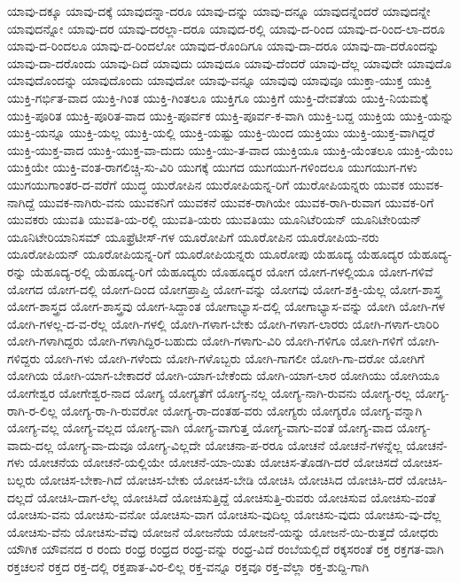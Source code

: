 {ಯಾವು-ದಕ್ಕೂ
ಯಾವು-ದಕ್ಕೆ
ಯಾವುದನ್ನಾ-ದರೂ
ಯಾವು-ದನ್ನು
ಯಾವು-ದನ್ನೂ
ಯಾವುದನ್ನೆಂದರೆ
ಯಾವುದನ್ನೇ
ಯಾವುದನ್ನೋ
ಯಾವು-ದರ
ಯಾವು-ದರಲ್ಲಾ-ದರೂ
ಯಾವುದ-ರಲ್ಲಿ
ಯಾವು-ದ-ರಿಂದ
ಯಾವು-ದ-ರಿಂದ-ಲಾ-ದರೂ
ಯಾವು-ದ-ರಿಂದಲೂ
ಯಾವು-ದ-ರಿಂದಲೋ
ಯಾವುದ-ರೊಂದಿಗೂ
ಯಾವು-ದಾ-ದರೂ
ಯಾವು-ದಾ-ದರೊಂದನ್ನು
ಯಾವು-ದಾ-ದರೊಂದು
ಯಾವು-ದಿದೆ
ಯಾವುದು
ಯಾವುದೂ
ಯಾವು-ದೆಂದರೆ
ಯಾವು-ದೆಲ್ಲ
ಯಾವುದೇ
ಯಾವುದೊ
ಯಾವುದೊಂದನ್ನು
ಯಾವುದೊಂದು
ಯಾವುದೋ
ಯಾವು-ವನ್ನೂ
ಯಾವುವು
ಯಾವುವೂ
ಯುಕ್ತಾ-ಯುಕ್ತ
ಯುಕ್ತಿ
ಯುಕ್ತಿ-ಗರ್ಭಿತ-ವಾದ
ಯುಕ್ತಿ-ಗಿಂತ
ಯುಕ್ತಿ-ಗಿಂತಲೂ
ಯುಕ್ತಿಗೂ
ಯುಕ್ತಿಗೆ
ಯುಕ್ತಿ-ದೇವತೆಯ
ಯುಕ್ತಿ-ನಿಯಮಕ್ಕೆ
ಯುಕ್ತಿ-ಪೂರಿತ
ಯುಕ್ತಿ-ಪೂರಿತ-ವಾದ
ಯುಕ್ತಿ-ಪೂರ್ವಕ
ಯುಕ್ತಿ-ಪೂರ್ವ-ಕ-ವಾಗಿ
ಯುಕ್ತಿ-ಬದ್ದ
ಯುಕ್ತಿಯ
ಯುಕ್ತಿ-ಯನ್ನು
ಯುಕ್ತಿ-ಯನ್ನೂ
ಯುಕ್ತಿ-ಯಲ್ಲ
ಯುಕ್ತಿ-ಯಲ್ಲಿ
ಯುಕ್ತಿ-ಯಷ್ಟು
ಯುಕ್ತಿ-ಯಿಂದ
ಯುಕ್ತಿಯು
ಯುಕ್ತಿ-ಯುಕ್ತ-ವಾಗಿದ್ದರೆ
ಯುಕ್ತಿ-ಯುಕ್ತ-ವಾದ
ಯುಕ್ತಿ-ಯುಕ್ತ-ವಾ-ದುದು
ಯುಕ್ತಿ-ಯು-ತ-ವಾದ
ಯುಕ್ತಿಯೂ
ಯುಕ್ತಿ-ಯೆಂತಲೂ
ಯುಕ್ತಿ-ಯೆಂಬ
ಯುಕ್ತಿಯೇ
ಯುಕ್ತಿ-ವಂತ-ರಾಗಲಿಚ್ಚಿ-ಸು-ವಿರಿ
ಯುಗಕ್ಕೆ
ಯುಗದ
ಯುಗಯುಗ-ಗಳಿಂದಲೂ
ಯುಗಯುಗ-ಗಳು
ಯುಗಯುಗಾಂತರ-ದ-ವರೆಗೆ
ಯುದ್ಧ
ಯುರೋಪಿನ
ಯುರೋಪಿಯನ್ನ-ರಿಗೆ
ಯುರೋಪಿಯನ್ನರು
ಯುವಕ
ಯುವಕ-ನಾಗಿದ್ದೆ
ಯುವಕ-ನಾಗಿರು-ವನು
ಯುವಕನಿಗೆ
ಯುವಕನೆ
ಯುವಕ-ರಾಗಿಯೇ
ಯುವಕ-ರಾಗಿ-ರುವಾಗ
ಯುವಕ-ರಿಗೆ
ಯುವಕರು
ಯುವತಿ
ಯುವತಿ-ಯ-ರಲ್ಲಿ
ಯುವತಿ-ಯರು
ಯುವತಿಯು
ಯೂನಿಟೆರಿಯನ್
ಯೂನಿಟೇರಿಯನ್
ಯೂನಿಟೇರಿಯಾನಿಸಮ್
ಯೂಫ್ರೆಟೀಸ್-ಗಳ
ಯೂರೋಪಿಗೆ
ಯೂರೋಪಿನ
ಯೂರೋಪಿಯ-ನರು
ಯೂರೋಪಿಯನ್
ಯೂರೋಪಿಯನ್ನ-ರಿಗೆ
ಯೂರೋಪಿಯನ್ನರು
ಯೂರೋಪು
ಯೆಹೂದ್ಯ
ಯೆಹೂದ್ಯರ
ಯೆಹೂದ್ಯ-ರನ್ನು
ಯೆಹೂದ್ಯ-ರಲ್ಲಿ
ಯೆಹೂದ್ಯ-ರಿಗೆ
ಯೆಹೂದ್ಯರು
ಯೊಹೂದ್ಯರ
ಯೋಗ
ಯೋಗ-ಗಳಲ್ಲಿಯೂ
ಯೋಗ-ಗಳಿವೆ
ಯೋಗದ
ಯೋಗ-ದಲ್ಲಿ
ಯೋಗ-ದಿಂದ
ಯೋಗಪ್ರಾಪ್ತಿ
ಯೋಗ-ವನ್ನು
ಯೋಗವು
ಯೋಗ-ಶಕ್ತಿ-ಯೆಲ್ಲ
ಯೋಗ-ಶಾಸ್ತ್ರ
ಯೋಗ-ಶಾಸ್ತ್ರದ
ಯೋಗ-ಶಾಸ್ತ್ರವು
ಯೋಗ-ಸಿದ್ದಾಂತ
ಯೋಗಾಭ್ಯಾಸ-ದಲ್ಲಿ
ಯೋಗಾಭ್ಯಾಸ-ವನ್ನು
ಯೋಗಿ
ಯೋಗಿ-ಗಳ
ಯೋಗಿ-ಗಳಲ್ಲ-ದ-ವ-ರೆಲ್ಲ
ಯೋಗಿ-ಗಳಲ್ಲಿ
ಯೋಗಿ-ಗಳಾಗ-ಬೇಕು
ಯೋಗಿ-ಗಳಾಗ-ಲಾರರು
ಯೋಗಿ-ಗಳಾಗ-ಲಾರಿರಿ
ಯೋಗಿ-ಗಳಾಗಿದ್ದರು
ಯೋಗಿ-ಗಳಾಗಿದ್ದಿರ-ಬಹುದು
ಯೋಗಿ-ಗಳಾಗು-ವಿರಿ
ಯೋಗಿ-ಗಳಿಗೂ
ಯೋಗಿ-ಗಳಿಗೆ
ಯೋಗಿ-ಗಳಿದ್ದರು
ಯೋಗಿ-ಗಳು
ಯೋಗಿ-ಗಳೆಂದು
ಯೋಗಿ-ಗಳೊಬ್ಬರು
ಯೋಗಿ-ಗಾಗಲೀ
ಯೋಗಿ-ಗಾ-ದರೋ
ಯೋಗಿಗೆ
ಯೋಗಿಯ
ಯೋಗಿ-ಯಾಗ-ಬೇಕಾದರೆ
ಯೋಗಿ-ಯಾಗ-ಬೇಕೆಂದು
ಯೋಗಿ-ಯಾಗ-ಲಾರ
ಯೋಗಿಯು
ಯೋಗಿಯೂ
ಯೋಗೇಶ್ವರ
ಯೋಗೇಶ್ವರ-ನಾದ
ಯೋಗ್ಯ
ಯೋಗ್ಯತೆಗೆ
ಯೋಗ್ಯ-ನಲ್ಲ
ಯೋಗ್ಯ-ನಾಗಿ-ರುವನು
ಯೋಗ್ಯ-ರಲ್ಲ
ಯೋಗ್ಯ-ರಾಗಿ-ರ-ಲಿಲ್ಲ
ಯೋಗ್ಯ-ರಾ-ಗಿ-ರುವರೋ
ಯೋಗ್ಯ-ರಾ-ದಂತಹ-ವರು
ಯೋಗ್ಯರು
ಯೋಗ್ಯರೊ
ಯೋಗ್ಯ-ವನ್ನಾಗಿ
ಯೋಗ್ಯ-ವಲ್ಲ
ಯೋಗ್ಯ-ವಲ್ಲದ
ಯೋಗ್ಯ-ವಾಗಿ
ಯೋಗ್ಯ-ವಾಗುತ್ತ
ಯೋಗ್ಯ-ವಾಗು-ವಂತೆ
ಯೋಗ್ಯ-ವಾದ
ಯೋಗ್ಯ-ವಾದು-ದಲ್ಲ
ಯೋಗ್ಯ-ವಾ-ದುವೂ
ಯೋಗ್ಯ-ವಿಲ್ಲದೇ
ಯೋಚನಾ-ಪ-ರರೂ
ಯೋಚನೆ
ಯೋಚನೆ-ಗಳನ್ನೆಲ್ಲ
ಯೋಚನೆ-ಗಳು
ಯೋಚನೆಯ
ಯೋಚನೆ-ಯಲ್ಲಿಯೇ
ಯೋಚನೆ-ಯಾ-ಯಿತು
ಯೋಚಿಸ-ತೊಡಗಿ-ದರೆ
ಯೋಚಿಸದೆ
ಯೋಚಿಸ-ಬಲ್ಲರು
ಯೋಚಿಸ-ಬೇಕಾ-ಗಿದೆ
ಯೋಚಿಸ-ಬೇಕು
ಯೋಚಿಸ-ಬೇಡಿ
ಯೋಚಿಸಿ
ಯೋಚಿಸಿದ
ಯೋಚಿಸಿ-ದರೆ
ಯೋಚಿಸಿ-ದಲ್ಲದೆ
ಯೋಚಿಸಿ-ದಾಗ-ಲೆಲ್ಲ
ಯೋಚಿಸಿದೆ
ಯೋಚಿಸುತ್ತಿದ್ದೆ
ಯೋಚಿಸುತ್ತಿ-ರುವರು
ಯೋಚಿಸುವ
ಯೋಚಿಸು-ವಂತೆ
ಯೋಚಿಸು-ವನು
ಯೋಚಿಸು-ವನೋ
ಯೋಚಿಸು-ವಾಗ
ಯೋಚಿಸು-ವುದಿಲ್ಲ
ಯೋಚಿಸು-ವುದು
ಯೋಚಿಸು-ವು-ದೆಲ್ಲ
ಯೋಚಿಸು-ವೆನು
ಯೋಚಿಸು-ವೆವು
ಯೋಜನೆ
ಯೋಜನೆಯ
ಯೋಜನೆ-ಯನ್ನು
ಯೋಜನೆ-ಯಿ-ರುತ್ತದೆ
ಯೋಧರು
ಯೌಗಿಕ
ಯೌವನದ
ರ
ರಂದು
ರಂಧ್ರ
ರಂಧ್ರದ
ರಂಧ್ರ-ವನ್ನು
ರಂಧ್ರ-ವಿದೆ
ರಂಬೆಯಲ್ಲಿದೆ
ರಕ್ಕಸರಂತೆ
ರಕ್ತ
ರಕ್ತಗತ-ವಾಗಿ
ರಕ್ತಚಲನೆ
ರಕ್ತದ
ರಕ್ತ-ದಲ್ಲಿ
ರಕ್ತಪಾತ-ವಿರ-ಲಿಲ್ಲ
ರಕ್ತ-ವನ್ನೂ
ರಕ್ತವೂ
ರಕ್ತ-ವೆಲ್ಲಾ
ರಕ್ತ-ಶುದ್ದಿ-ಗಾಗಿ
}
